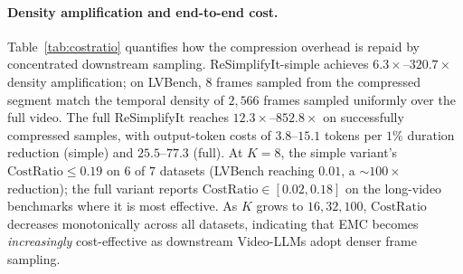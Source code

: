 \begin{table}[!t]
  \vspace{0.3em}
  \begin{subtable}{\columnwidth}
    \centering
    \caption{ReSimplifyIt (full).}
    \label{tab:costratio_full}
  \end{subtable}
  \caption{Density amplification (DensAmp), output-token cost per $1\%$ of video-length reduction (OT/1\%), and visual CostRatio under four downstream frame budgets $K$. Statistics are averaged over successfully compressed samples.}
  \label{tab:costratio}
\end{table}

\paragraph{Density amplification and end-to-end cost.}
Table~\ref{tab:costratio} quantifies how the compression overhead is repaid by concentrated downstream sampling. ReSimplifyIt-simple achieves $6.3\times$--$320.7\times$ density amplification; on LVBench, $8$ frames sampled from the compressed segment match the temporal density of $2{,}566$ frames sampled uniformly over the full video. The full ReSimplifyIt reaches $12.3\times$--$852.8\times$ on successfully compressed samples, with output-token costs of $3.8$--$15.1$ tokens per $1\%$ duration reduction (simple) and $25.5$--$77.3$ (full). At $K{=}8$, the simple variant's $\mathrm{CostRatio}\leq 0.19$ on $6$ of $7$ datasets (LVBench reaching $0.01$, a ${\sim}100\times$ reduction); the full variant reports $\mathrm{CostRatio}\in[0.02, 0.18]$ on the long-video benchmarks where it is most effective. As $K$ grows to $16, 32, 100$, $\mathrm{CostRatio}$ decreases monotonically across all datasets, indicating that EMC becomes \emph{increasingly} cost-effective as downstream Video-LLMs adopt denser frame sampling.

